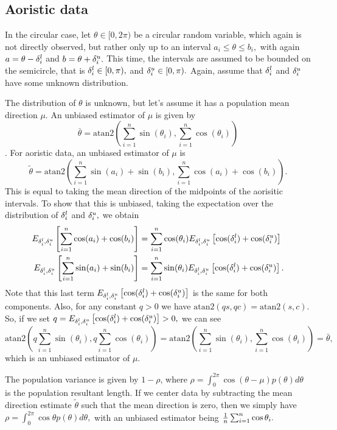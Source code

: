 \subsection{Aoristic data} \label{aoproof}

In the circular case, let $\theta \in [0, 2\pi)$ be a circular random variable, which again  is not directly observed, but rather only up to an interval $a_i \leq \theta \leq b_i,$ with again $a = \theta - {\delta^l_i}$ and $b = \theta + {\delta^u_i}.$ This time, the intervals are assumed to be bounded on the semicircle, that is ${\delta^l_i} \in [0, \pi),$ and ${\delta^u_i} \in [0, \pi).$ Again, assume that ${\delta^l_i}$ and ${\delta^u_i}$ have some unknown distribution.

The distribution of $\theta$ is unknown, but let's assume it has a population mean direction $\mu$. An unbiased estimator of $\mu$ is given by \[\bar\theta = \text{atan2}(\sum_{i=1}^n \sin(\theta_i), \sum_{i=1}^n \cos(\theta_i))\] \citep{mardia2009directional}. For aoristic data, an unbiased estimator of $\mu$ is
\begin{equation}
\tilde\theta = \text{atan2} \left( \sum_{i=1}^n \sin(a_i) + \sin(b_i), \sum_{i=1}^n \cos(a_i) + \cos(b_i) \right).
\end{equation}
This is equal to taking the mean direction of the midpoints of the aorisitic intervals. To show that this is unbiased, taking the expectation over the distribution of ${\delta^l_i}$ and ${\delta^u_i},$ we obtain
\begin{align}
E_{{\delta^l_i}, {\delta^u_i}} \left[\sum_{i=1}^n \cos(a_i) + \cos(b_i)\right] &= \sum_{i=1}^n \cos(\theta_i) E_{{\delta^l_i}, {\delta^u_i}} \left[ \cos({\delta^l_i}) + \cos({\delta^u_i}) \right] \\
E_{{\delta^l_i}, {\delta^u_i}} \left[\sum_{i=1}^n \sin(a_i) + \sin(b_i)\right] &= \sum_{i=1}^n \sin(\theta_i) E_{{\delta^l_i}, {\delta^u_i}} \left[ \cos({\delta^l_i}) + \cos({\delta^u_i}) \right].
\end{align}
Note that this last term $E_{{\delta^l_i}, {\delta^u_i}} \left[ \cos({\delta^l_i}) + \cos({\delta^u_i}) \right]$ is the same for both components. Also, for any constant $q > 0$ we have $\text{atan2}(qs, qc) = \text{atan2}(s, c).$ So, if we set $q = E_{{\delta^l_i}, {\delta^u_i}} \left[ \cos({\delta^l_i}) + \cos({\delta^u_i}) \right] > 0,$ we can see
\begin{equation}
\text{atan2}\left(q \sum_{i=1}^n \sin(\theta_i), q \sum_{i=1}^n \cos(\theta_i) \right) = \text{atan2}\left(\sum_{i=1}^n \sin(\theta_i), \sum_{i=1}^n \cos(\theta_i)\right) = \bar\theta,
\end{equation}
which is an unbiased estimator of $\mu$.

The population variance is given by $1 - \rho$, where $\rho = \int_0^{2\pi} \cos(\theta - \mu) p(\theta) d\theta$ is the population resultant length. If we center data by subtracting the mean direction estimate  $\tilde\theta$ such that the mean direction is zero, then we simply have $\rho = \int_0^{2\pi} \cos\theta p(\theta) d\theta,$ with an unbiased estimator being $\frac{1}{n}\sum_{i=1}^n \cos\theta_i.$

